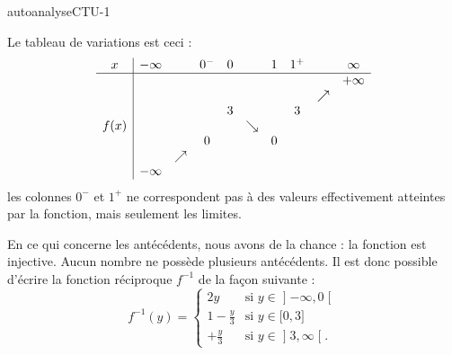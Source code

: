 
\begin{corrige}{autoanalyseCTU-1}

\begin{center}
   
\end{center}

Le tableau de variations est ceci :
\begin{equation*}
    \begin{array}[]{c|ccccccccc}
        x&-\infty&&0^-&0&&1&1^+&&\infty\\
        \hline
        &&&&&&&&&+\infty\\
        &&&&&&&&\nearrow&\\
        &&&&3&&&3&&\\
        f(x)&&&&&\searrow&&&&\\
        &&&0&&&0&&&\\
        &&\nearrow&&&&&&&\\
        &-\infty&&&&&&&&\\
    \end{array}
\end{equation*}
les colonnes \( 0^-\) et \( 1^+\) ne correspondent pas à des valeurs effectivement atteintes par la fonction, mais seulement les limites.

En ce qui concerne les antécédents, nous avons de la chance : la fonction est injective. Aucun nombre ne possède plusieurs antécédents. Il est donc possible d'écrire la fonction réciproque \( f^{-1}\) de la façon suivante :
\begin{equation}
    f^{-1}(y)=\begin{cases}
    2y   &   \text{si } y\in\mathopen] -\infty , 0 \mathclose[\\
        1-\frac{ y }{ 3 }    &    \text{si } y\in\mathopen[ 0 , 3 \mathclose]\\
    +\frac{ y }{ 3 }    &    \text{si } y\in\mathopen] 3 , \infty \mathclose[.
    \end{cases}
\end{equation}

\end{corrige}   

